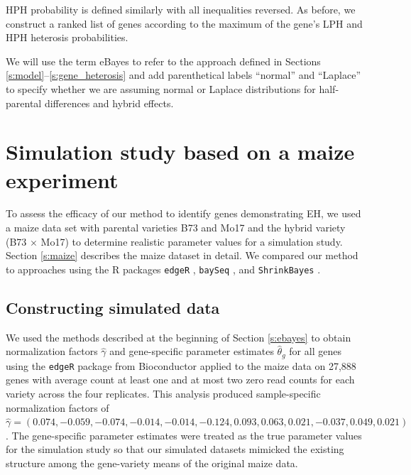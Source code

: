 \documentclass[useAMS,usenatbib,referee]{biom}
\newcommand{\edgeR}{{\tt edgeR}}
\newcommand{\baySeq}{{\tt baySeq}}
\newcommand{\ShrinkBayes}{{\tt ShrinkBayes}}
\begin{document}
HPH probability is defined similarly with all inequalities reversed. As before, we construct a ranked list of genes according to the maximum of the gene's LPH and HPH heterosis probabilities.

We will use the term eBayes to refer to the approach defined in Sections \ref{s:model}--\ref{s:gene_heterosis} and add parenthetical labels ``normal'' and ``Laplace'' to specify whether we are assuming normal or Laplace distributions for half-parental differences and hybrid effects.

\section{Simulation study based on a maize experiment}
\label{s:simulation}

% 

To assess the efficacy of our method to identify genes demonstrating EH, we used a maize data set with parental varieties B73 and Mo17 and the hybrid variety (B73 $\times$ Mo17) \citep{paschold2012complementation} to determine realistic parameter values for a simulation study. Section \ref{s:maize} describes the maize dataset in detail. We compared our method to approaches using the R packages \edgeR{} , \baySeq{} \citep{hardcastle2010bayseq, hardcastle2012baySeq}, and \ShrinkBayes{} \citep{van2014shrinkbayes}.

\subsection{Constructing simulated data}
\label{s:sim_data}

We used the methods described at the beginning of Section \ref{s:ebayes} to obtain normalization factors $\hat{\gamma}$ and gene-specific parameter estimates $\hat{\theta}_g$ for all genes using the \edgeR{} package \citep{robinson2010edgeR} from Bioconductor \citep{gentleman2004bioconductor} applied to the maize data on 27,888 genes with average count at least one and at most two zero read counts for each variety across the four replicates.  This analysis produced sample-specific normalization factors of $\hat{\gamma}=
(0.074, -0.059, -0.074, -0.014, -0.014, -0.124,  0.093,  0.063,  0.021, -0.037,  0.049,  0.021)$. The  gene-specific parameter estimates were treated as the true parameter values for the simulation study so that our simulated datasets mimicked the existing structure among the gene-variety means of the original maize data. 
\end{document}
